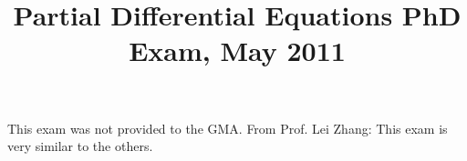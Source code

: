 \documentclass[11pt,letterpaper]{article}
\title{Partial Differential Equations PhD Exam, May 2011}
\author{}
\date{}
\newenvironment{examinstructions}{%
  \par\begingroup\itshape
}{%
  \par\endgroup\vspace{0.18em}
}
\begin{document}
\maketitle
\thispagestyle{empty}
\begin{examinstructions}
This exam was not provided to the GMA. From Prof. Lei Zhang: This exam is very similar to the others.
\end{examinstructions}
\end{document}

